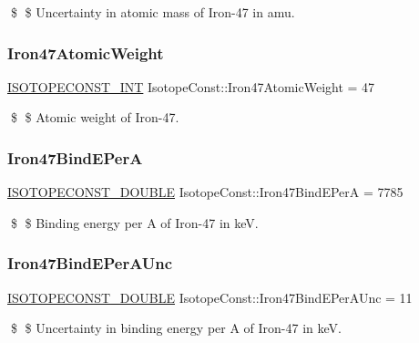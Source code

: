\$ \$ Uncertainty in atomic mass of Iron-\/47 in amu. \mbox{\label{group___isotope_const-_iron-_fe47_ga13e1277325b21bea37e22dc698f5a088}} 
\subsubsection{\texorpdfstring{Iron47\+Atomic\+Weight}{Iron47AtomicWeight}}
{\footnotesize\ttfamily \mbox{\hyperlink{group___isotope_const-_macros_ga5f18360b3e99483a35c32d789e62621c}{I\+S\+O\+T\+O\+P\+E\+C\+O\+N\+S\+T\+\_\+\+I\+NT}} Isotope\+Const\+::\+Iron47\+Atomic\+Weight = 47}

\$ \$ Atomic weight of Iron-\/47. \mbox{\label{group___isotope_const-_iron-_fe47_ga462c389be62c1c767e8dab90226348c2}} 
\subsubsection{\texorpdfstring{Iron47\+Bind\+E\+PerA}{Iron47BindEPerA}}
{\footnotesize\ttfamily \mbox{\hyperlink{group___isotope_const-_macros_ga8f45a7272ce02c0b4c65c44636ed719a}{I\+S\+O\+T\+O\+P\+E\+C\+O\+N\+S\+T\+\_\+\+D\+O\+U\+B\+LE}} Isotope\+Const\+::\+Iron47\+Bind\+E\+PerA = 7785}

\$ \$ Binding energy per A of Iron-\/47 in keV. \mbox{\label{group___isotope_const-_iron-_fe47_ga87aa4e92d1f6f8f9718868539d9758d0}} 
\subsubsection{\texorpdfstring{Iron47\+Bind\+E\+Per\+A\+Unc}{Iron47BindEPerAUnc}}
{\footnotesize\ttfamily \mbox{\hyperlink{group___isotope_const-_macros_ga8f45a7272ce02c0b4c65c44636ed719a}{I\+S\+O\+T\+O\+P\+E\+C\+O\+N\+S\+T\+\_\+\+D\+O\+U\+B\+LE}} Isotope\+Const\+::\+Iron47\+Bind\+E\+Per\+A\+Unc = 11}

\$ \$ Uncertainty in binding energy per A of Iron-\/47 in keV. \mbox{\label{group___isotope_const-_iron-_fe47_ga61f7b1991c84e6e6e0c71a7c2dbf0fb8}} 
